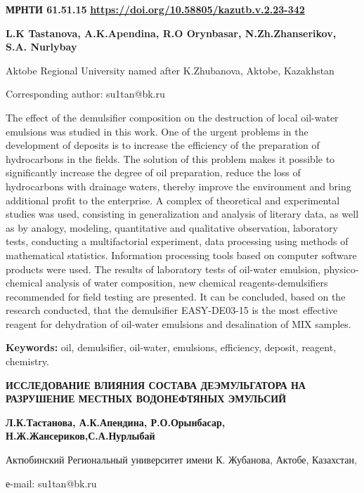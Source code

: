 \newpage
{}
{\bfseries МРНТИ 61.51.15}
\hfill {\bfseries \href{https://doi.org/10.58805/kazutb.v.2.23-342}{https://doi.org/10.58805/kazutb.v.2.23-342}}


\begin{center}
{\bfseries L.K Tastanova, A.K.Apendina, R.O Orynbasar, N.Zh.Zhanserikov, S.A. Nurlybay\envelope}

Aktobe Regional University named after K.Zhubanova, Aktobe, Kazakhstan

\envelope Corresponding author: su1tan@bk.ru
\end{center}

The effect of the demulsifier composition on the destruction of local
oil-water emulsions was studied in this work. One of the urgent problems
in the development of deposits is to increase the efficiency of the
preparation of hydrocarbons in the fields. The solution of this problem
makes it possible to significantly increase the degree of oil
preparation, reduce the loss of hydrocarbons with drainage waters,
thereby improve the environment and bring additional profit to the
enterprise. A complex of theoretical and experimental studies was used,
consisting in generalization and analysis of literary data, as well as
by analogy, modeling, quantitative and qualitative observation,
laboratory tests, conducting a multifactorial experiment, data
processing using methods of mathematical statistics. Information
processing tools based on computer software products were used. The
results of laboratory tests of oil-water emulsion, physico-chemical
analysis of water composition, new chemical reagents-demulsifiers
recommended for field testing are presented. It can be concluded, based
on the research conducted, that the demulsifier EASY-DE03-15 is the most
effective reagent for dehydration of oil-water emulsions and
desalination of MIX samples.

{\bfseries Keywords:} oil, demulsifier, oil-water, emulsions, efficiency,
deposit, reagent, chemistry.

\begin{center}
{\large\bfseries ИССЛЕДОВАНИЕ ВЛИЯНИЯ СОСТАВА ДЕЭМУЛЬГАТОРА НА РАЗРУШЕНИЕ МЕСТНЫХ ВОДОНЕФТЯНЫХ ЭМУЛЬСИЙ}

{\bfseries Л.К.Тастанова, А.К.Апендина, Р.О.Орынбасар, Н.Ж.Жансериков,С.А.Нурлыбай\envelope}

Актюбинский Региональный университет имени К. Жубанова, Актобе,
Казахстан,

е-mail: su1tan@bk.ru
\end{center}

